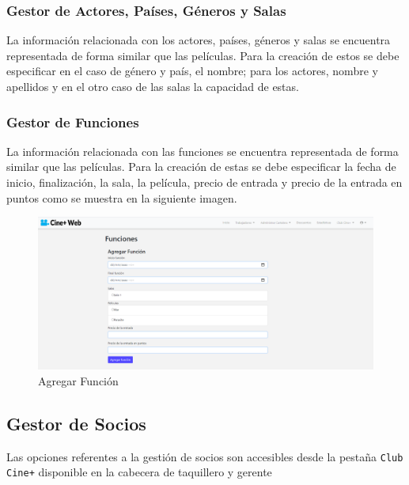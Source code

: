 \subsubsection{Gestor de Actores, Pa\'ises, G\'eneros y Salas }

La informaci\'on relacionada con los actores, pa\'ises, g\'eneros y salas se encuentra representada de forma similar que las pel\'iculas. Para la creaci\'on de estos se debe especificar en el caso de g\'enero y pa\'is, el nombre; para los actores, nombre y apellidos y en el otro caso de las salas la capacidad de estas.

\subsubsection{Gestor de Funciones}
La informaci\'on relacionada con las funciones se encuentra representada de forma similar que las pel\'iculas. Para la creaci\'on de estas se debe especificar la fecha de inicio, finalizaci\'on, la sala, la pel\'icula, precio de entrada y precio de la entrada en puntos como se muestra en la siguiente imagen.

\begin{figure}[h!]
	\centering
	\includegraphics[scale=0.35]{./chapters/img/add_function.png}
	
	\label{fig:add_function}
	\caption{Agregar Funci\'on}
	
\end{figure}

\subsection{Gestor de Socios}
Las opciones referentes a la gesti\'on de socios son accesibles desde la pesta\~na \verb*|Club| \verb*|Cine+| disponible en la cabecera de taquillero y gerente

